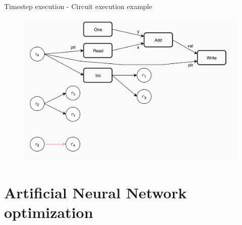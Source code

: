 \documentclass[xcolor={usenames}]{beamer}
\begin{document}
  \begin{frame}{Timestep execution - Circuit execution example}
  	\begin{figure}
  		\centering
  		\includegraphics[width=\textwidth]{../figures/example-circuit-21.png}
  	\end{figure}
  \end{frame}
  \fi
  
  \iffalse
  \section{Artificial Neural Network optimization}
\end{document}
